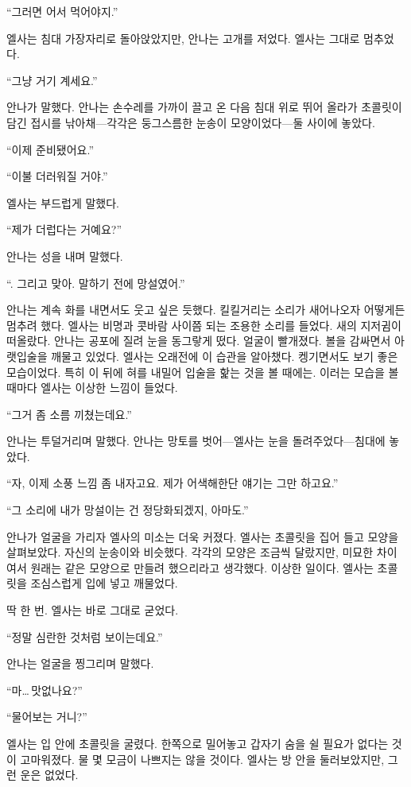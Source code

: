 ``그러면 어서 먹어야지.''

엘사는 침대 가장자리로 돌아앉았지만, 안나는 고개를 저었다. 엘사는 그대로 멈추었다.

``그냥 거기 계세요.''

안나가 말했다. 안나는 손수레를 가까이 끌고 온 다음 침대 위로 뛰어 올라가 초콜릿이 담긴 접시를 낚아채—각각은 둥그스름한 눈송이 모양이었다—둘 사이에 놓았다.

``이제 준비됐어요.''

``이불 더러워질 거야.''

엘사는 부드럽게 말했다.

``제가 더럽다는 거예요?''

안나는 성을 내며 말했다.

``. 그리고 맞아. 말하기 전에 망설였어.''

안나는 계속 화를 내면서도 웃고 싶은 듯했다. 킬킬거리는 소리가 새어나오자 어떻게든 멈추려 했다. 엘사는 비명과 콧바람 사이쯤 되는 조용한 소리를 들었다. 새의 지저귐이 떠올랐다. 안나는 공포에 질려 눈을 동그랗게 떴다. 얼굴이 빨개졌다. 볼을 감싸면서 아랫입술을 깨물고 있었다. 엘사는 오래전에 이 습관을 알아챘다. 켕기면서도 보기 좋은 모습이었다. 특히 이 뒤에 혀를 내밀어 입술을 핥는 것을 볼 때에는. 이러는 모습을 볼 때마다 엘사는 이상한 느낌이 들었다.

``그거 좀 소름 끼쳤는데요.''

안나는 투덜거리며 말했다. 안나는 망토를 벗어—엘사는 눈을 돌려주었다—침대에 놓았다.

``자, 이제 소풍 느낌 좀 내자고요. 제가 어색해한단 얘기는 그만 하고요.''

``그 소리에 내가 망설이는 건 정당화되겠지, 아마도.''

안나가 얼굴을 가리자 엘사의 미소는 더욱 커졌다. 엘사는 초콜릿을 집어 들고 모양을 살펴보았다. 자신의 눈송이와 비슷했다. 각각의 모양은 조금씩 달랐지만, 미묘한 차이여서 원래는 같은 모양으로 만들려 했으리라고 생각했다. 이상한 일이다. 엘사는 초콜릿을 조심스럽게 입에 넣고 깨물었다.

딱 한 번. 엘사는 바로 그대로 굳었다.

``정말 심란한 것처럼 보이는데요.''

안나는 얼굴을 찡그리며 말했다.

``마\ldots\,맛없나요?''

`` 물어보는 거니?''

엘사는 입 안에 초콜릿을 굴렸다. 한쪽으로 밀어놓고 갑자기 숨을 쉴 필요가 없다는 것이 고마워졌다. 물 몇 모금이 나쁘지는 않을 것이다. 엘사는 방 안을 둘러보았지만, 그런 운은 없었다.

